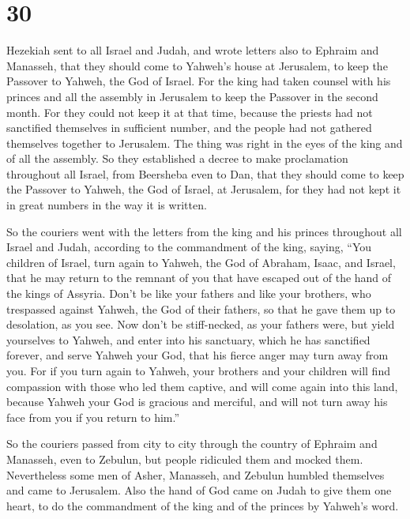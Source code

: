 \hypertarget{section-29}{%
\section{30}\label{section-29}}

 Hezekiah sent to all Israel and Judah, and wrote letters
also to Ephraim and Manasseh, that they should come to Yahweh's house at
Jerusalem, to keep the Passover to Yahweh, the God of Israel.
 For the king had taken counsel with his princes and all the
assembly in Jerusalem to keep the Passover in the second month.
 For they could not keep it at that time, because the
priests had not sanctified themselves in sufficient number, and the
people had not gathered themselves together to Jerusalem. 
The thing was right in the eyes of the king and of all the assembly.
 So they established a decree to make proclamation
throughout all Israel, from Beersheba even to Dan, that they should come
to keep the Passover to Yahweh, the God of Israel, at Jerusalem, for
they had not kept it in great numbers in the way it is written.

 So the couriers went with the letters from the king and his
princes throughout all Israel and Judah, according to the commandment of
the king, saying, ``You children of Israel, turn again to Yahweh, the
God of Abraham, Isaac, and Israel, that he may return to the remnant of
you that have escaped out of the hand of the kings of Assyria.
 Don't be like your fathers and like your brothers, who
trespassed against Yahweh, the God of their fathers, so that he gave
them up to desolation, as you see.  Now don't be
stiff-necked, as your fathers were, but yield yourselves to Yahweh, and
enter into his sanctuary, which he has sanctified forever, and serve
Yahweh your God, that his fierce anger may turn away from you.
 For if you turn again to Yahweh, your brothers and your
children will find compassion with those who led them captive, and will
come again into this land, because Yahweh your God is gracious and
merciful, and will not turn away his face from you if you return to
him.''

 So the couriers passed from city to city through the
country of Ephraim and Manasseh, even to Zebulun, but people ridiculed
them and mocked them.  Nevertheless some men of Asher,
Manasseh, and Zebulun humbled themselves and came to Jerusalem.
 Also the hand of God came on Judah to give them one heart,
to do the commandment of the king and of the princes by Yahweh's word.

